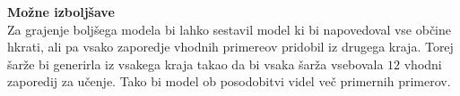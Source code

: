 \documentclass[12pt]{article}
\begin{document}
\textbf{Možne izboljšave}\\
Za grajenje boljšega modela bi lahko sestavil model ki bi napovedoval 
vse občine hkrati, ali pa vsako zaporedje vhodnih primereov pridobil
iz drugega kraja. Torej šarže bi generirla iz vsakega kraja takao da bi vsaka 
šarža vsebovala $12$ vhodni zaporedij za učenje. 
Tako bi model ob posodobitvi videl več primernih primerov.
\end{document}

